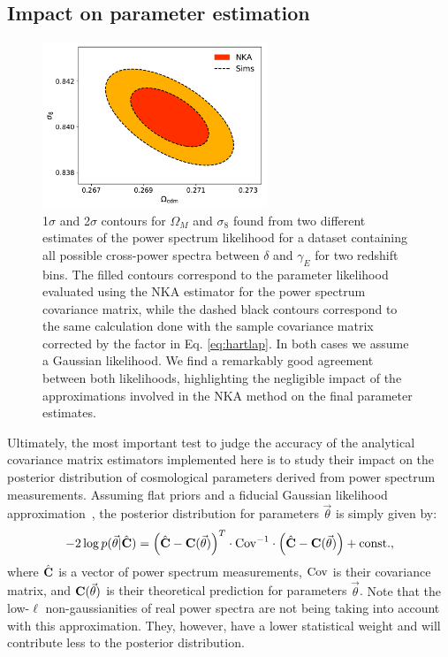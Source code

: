 \documentclass[a4paper,11pt]{article}
\newcommand{\cgg}[1]{{\color{olive} #1}}
\begin{document}
    \subsection{Impact on parameter estimation}\label{ssec:results.cosmo}
      \begin{figure}
        \centering
        \includegraphics[width=0.6\textwidth]{./figures/contours_2bin.pdf}
        \caption{1$\sigma$ and 2$\sigma$ contours for $\Omega_M$ and $\sigma_8$ found from two different estimates of the power spectrum likelihood for a dataset containing all possible cross-power spectra between $\delta$ and $\gamma_E$ for two redshift bins. The filled contours correspond to the parameter likelihood evaluated using the NKA estimator for the power spectrum covariance matrix, while the dashed black contours correspond to the same calculation done with the sample covariance matrix corrected by the factor in Eq. \ref{eq:hartlap}. In both cases we assume a Gaussian likelihood. We find a remarkably good agreement between both likelihoods, highlighting the negligible impact of the approximations involved in the NKA method on the final parameter estimates.} \label{fig:contours}
      \end{figure}
      Ultimately, the most important test to judge the accuracy of the
      analytical covariance matrix estimators implemented here is to study
      their impact on the posterior distribution of cosmological parameters
      derived from power spectrum measurements. Assuming flat priors \cgg{and
      a fiducial Gaussian likelihood approximation~\cite{2008PhRvD..77j3013H}}, the posterior distribution for parameters $\vec{\theta}$ is simply given by:
      \begin{equation}\label{eq:parpos}
        -2\log p(\vec{\theta}|\hat{\bf C})=\left(\hat{\bf C}-{\bf C}(\vec{\theta})\right)^T\cdot{\rm Cov}^{-1}\cdot\left(\hat{\bf C}-{\bf C}(\vec{\theta})\right)+{\rm const.},
      \end{equation}
      where $\hat{\bf C}$ is a vector of power spectrum measurements, ${\rm Cov}$ is their covariance matrix, and ${\bf C}(\vec{\theta})$ is their theoretical prediction for parameters $\vec{\theta}$.
      \cgg{Note that the low-$\ell$ non-gaussianities of real power spectra
        are not being taking into account with this approximation. They,
        however, have a lower statistical weight and will contribute less to
        the posterior distribution.}
\end{document}
